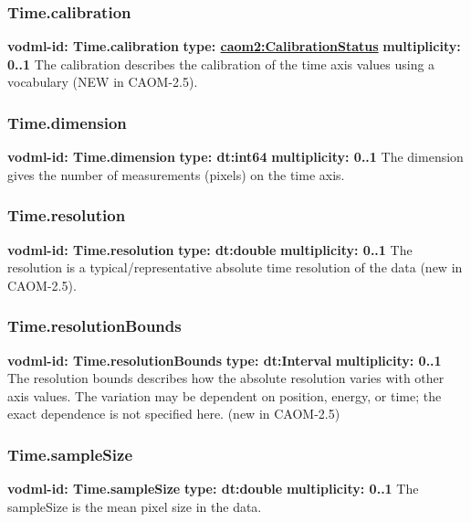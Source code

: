     \subsubsection{Time.calibration}
      \textbf{vodml-id: Time.calibration} \newline
      \textbf{type: \hyperref[sect:CalibrationStatus]{caom2:CalibrationStatus}} \newline
      \textbf{multiplicity: 0..1} \newline
      The calibration describes the calibration of the time axis values using a vocabulary (NEW in CAOM-2.5).

    \subsubsection{Time.dimension}
      \textbf{vodml-id: Time.dimension} \newline
      \textbf{type: dt:int64} \newline
      \textbf{multiplicity: 0..1} \newline
      The dimension gives the number of measurements (pixels) on the time axis.

    \subsubsection{Time.resolution}
      \textbf{vodml-id: Time.resolution} \newline
      \textbf{type: dt:double} \newline
      \textbf{multiplicity: 0..1} \newline
      The resolution is a typical/representative absolute time resolution of the data (new in CAOM-2.5).

    \subsubsection{Time.resolutionBounds}
      \textbf{vodml-id: Time.resolutionBounds} \newline
      \textbf{type: dt:Interval} \newline
      \textbf{multiplicity: 0..1} \newline
      The resolution bounds describes how the absolute resolution varies with other axis values. The variation may be dependent on position, energy, or time; the exact dependence is not specified here. (new in CAOM-2.5)

    \subsubsection{Time.sampleSize}
      \textbf{vodml-id: Time.sampleSize} \newline
      \textbf{type: dt:double} \newline
      \textbf{multiplicity: 0..1} \newline
      The sampleSize is the mean pixel size in the data.

